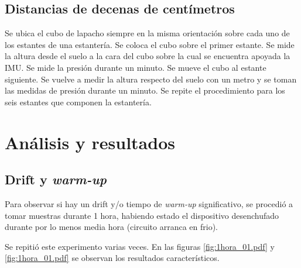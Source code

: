 \documentclass[spanish,12pt,a4paper,titlepage]{report}
\begin{document}
\subsection{Distancias de decenas de centímetros}

Se ubica el cubo de lapacho siempre en la misma orientación sobre cada uno de los estantes de una estantería. Se coloca el cubo sobre el primer estante. Se mide la altura desde el suelo a la cara del cubo sobre la cual se encuentra apoyada la IMU. Se mide la presión durante un minuto. Se mueve el cubo al estante siguiente. Se vuelve a medir la altura respecto del suelo con un metro y se toman las medidas de presión durante un minuto. Se repite el procedimiento para los seis estantes que componen la estantería. 

\newpage
\section{Análisis y resultados}

\subsection{Drift y \textit{warm-up}}
\label{sec:drift-y-warm-up}

Para observar si hay un drift y/o tiempo de \textit{warm-up} significativo, se procedió a tomar muestras durante 1 hora, habiendo estado el dispositivo desenchufado durante por lo menos media hora (circuito arranca en frio).

Se repitió este experimento varias veces. En las figuras \ref{fig:1hora_01.pdf} y \ref{fig:1hora_01.pdf} se observan los resultados característicos.
\end{document}
